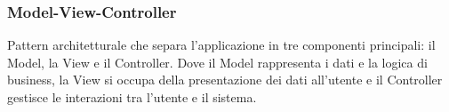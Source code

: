 
\subsubsection*{Model-View-Controller}
Pattern architetturale che separa l'applicazione in tre componenti principali: il Model, la View e il Controller.
Dove il Model rappresenta i dati e la logica di business, la View si occupa della presentazione dei dati all'utente e il Controller gestisce le interazioni tra l'utente e 
il sistema.

\newpage